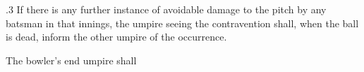\documentclass[12pt]{article}
\begin{document}
\vspace{\baselineskip}
\begin{adjustwidth}{0.5in}{0.12in}
{\fontsize{9pt}{10.8pt}.3 If there is any further instance of avoidable damage to the pitch by any batsman in that innings, the umpire seeing the contravention shall, when the ball is dead, inform the other umpire of the occurrence.\par}\par

\end{adjustwidth}


\vspace{\baselineskip}

\vspace{\baselineskip}

\vspace{\baselineskip}
\begin{Center}
{\fontsize{8pt}{9.6pt}\par}
\end{Center}\par


\vspace{\baselineskip}
\begin{adjustwidth}{0.5in}{0.0in}
{\fontsize{9pt}{10.8pt}\selectfont The bowler’s end umpire shall\par}\par

\end{adjustwidth}
\end{document}
